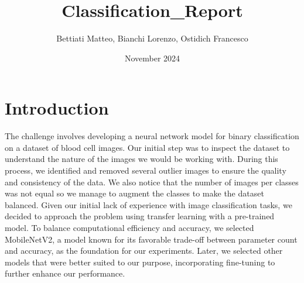 \documentclass{article}
\title{Classification\_Report}
\author{Bettiati Matteo, Bianchi Lorenzo, Ostidich Francesco}
\date{November 2024}
\begin{document}
\maketitle

\section{Introduction}
The challenge involves developing a neural network model for binary classification on a dataset of blood cell images. Our initial step was to inspect the dataset to understand the nature of the images we would be working with. During this process, we identified and removed several outlier images to ensure the quality and consistency of the data. We also notice that the number of images per classes was not equal so we manage to augment the classes to make the dataset balanced. Given our initial lack of experience with image classification tasks, we decided to approach the problem using transfer learning with a pre-trained model. To balance computational efficiency and accuracy, we selected MobileNetV2, a model known for its favorable trade-off between parameter count and accuracy, as the foundation for our experiments. Later, we selected other models that were better suited to our purpose, incorporating fine-tuning to further enhance our performance.
\end{document}
